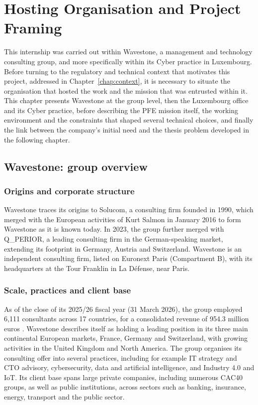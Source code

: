 \chapter{Hosting Organisation and Project Framing}
\label{chap:framing}

This internship was carried out within Wavestone, a management and technology
consulting group, and more specifically within its Cyber practice in
Luxembourg. Before turning to the regulatory and technical context that
motivates this project, addressed in Chapter~\ref{chap:context}, it is
necessary to situate the organisation that hosted the work and the mission
that was entrusted within it. This chapter presents Wavestone at the group
level, then the Luxembourg office and its Cyber practice, before describing
the PFE mission itself, the working environment and the constraints that
shaped several technical choices, and finally the link between the company's
initial need and the thesis problem developed in the following chapter.

\section{Wavestone: group overview}
\label{sec:framing-group}

\subsection{Origins and corporate structure}

Wavestone traces its origins to Solucom, a consulting firm founded in 1990,
which merged with the European activities of Kurt Salmon in January 2016 to
form Wavestone as it is known today. In 2023, the group further merged with
Q\_PERIOR, a leading consulting firm in the German-speaking market,
extending its footprint in Germany, Austria and Switzerland. Wavestone is an
independent consulting firm, listed on Euronext Paris (Compartment B), with
its headquarters at the Tour Franklin in La D\'efense, near Paris.

\subsection{Scale, practices and client base}

As of the close of its 2025/26 fiscal year (31 March 2026), the group
employed 6,111 consultants across 17 countries, for a consolidated revenue
of 954.3 million euros \cite{wavestone2026results}. Wavestone describes
itself as holding a leading position in its three main continental European
markets, France, Germany and Switzerland, with growing activities in the
United Kingdom and North America. The group organises its consulting offer
into several practices, including for example IT strategy and CTO advisory,
cybersecurity, data and artificial intelligence, and Industry 4.0 and IoT.
Its client base spans large private companies, including numerous CAC40
groups, as well as public institutions, across sectors such as banking,
insurance, energy, transport and the public sector.

